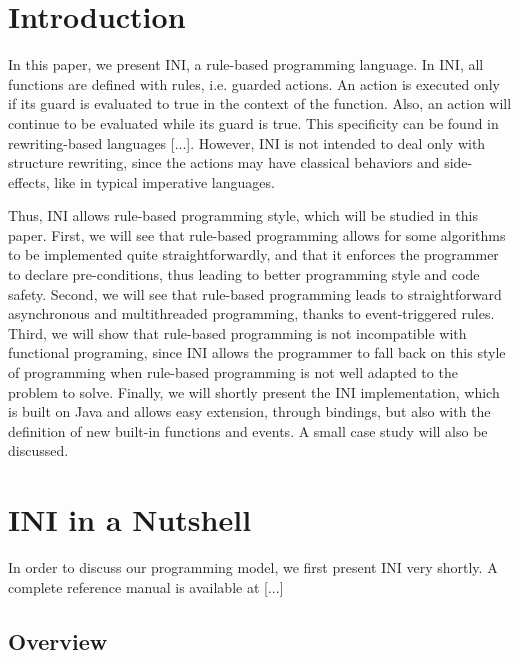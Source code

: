 \documentclass{sig-alternate}
\begin{document}


\section{Introduction}

In this paper, we present INI, a rule-based programming language. In INI, all functions are defined with rules, i.e. guarded actions. An action is executed only if its guard is evaluated to true in the context of the function. Also, an action will continue to be evaluated while its guard is true. This specificity can be found in rewriting-based languages [...]. However, INI is not intended to deal only with structure rewriting, since the actions may have classical behaviors and side-effects, like in typical imperative languages. 

Thus, INI allows rule-based programming style, which will be studied in this paper. First, we will see that rule-based programming allows for some algorithms to be implemented quite straightforwardly, and that it enforces the programmer to declare pre-conditions, thus leading to better programming style and code safety. Second, we will see that rule-based programming leads to straightforward asynchronous and multithreaded programming, thanks to event-triggered rules. Third, we will show that rule-based programming is not incompatible with functional programing, since INI allows the programmer to fall back on this style of programming when rule-based programming is not well adapted to the problem to solve. Finally, we will shortly present the INI implementation, which is built on Java and allows easy extension, through bindings, but also with the definition of new built-in functions and events. A small case study will also be discussed.

\section{INI in a Nutshell}

In order to discuss our programming model, we first present INI very shortly. A complete reference manual is available at [...]

\subsection{Overview}
\end{document}
